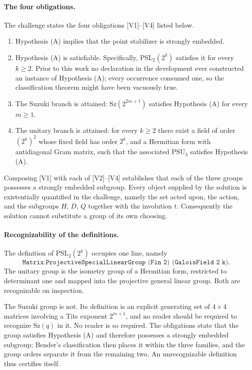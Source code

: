\documentclass{article}
\begin{document}
\paragraph{The four obligations.}
The challenge states the four obligations \textsc{[V1]}--\textsc{[V4]} listed
below.
\begin{enumerate}
  \item[\textsc{[V1]}] Hypothesis (A) implies that the point stabilizer is
  strongly embedded.

  \item[\textsc{[V2]}] Hypothesis (A) is satisfiable. Specifically,
  \(\mathrm{PSL}_2(2^k)\) satisfies it for every \(k\ge 2\). Prior to this work
  no declaration in the development ever constructed an instance of Hypothesis
  (A); every occurrence consumed one, so the classification theorem might have
  been vacuously true.

  \item[\textsc{[V3]}] The Suzuki branch is attained: \(\mathrm{Sz}(2^{2m+1})\)
  satisfies Hypothesis (A) for every \(m\ge 1\).

  \item[\textsc{[V4]}] The unitary branch is attained: for every \(k\ge2\) there
  exist a field of order \((2^k)^2\) whose fixed field has order \(2^k\), and a
  Hermitian form with antidiagonal Gram matrix, such that the associated
  \(\mathrm{PSU}_3\) satisfies Hypothesis (A).
\end{enumerate}
Composing \textsc{[V1]} with each of \textsc{[V2]}--\textsc{[V4]} establishes
that each of the three groups possesses a strongly embedded subgroup. Every
object supplied by the solution is existentially quantified in the challenge,
namely the set acted upon, the action, and the subgroups \(H\), \(D\), \(Q\)
together with the involution \(t\). Consequently the solution cannot substitute
a group of its own choosing.

\paragraph{Recognizability of the definitions.}
The definition of \(\mathrm{PSL}_2(2^k)\) occupies one line, namely
\[
  \texttt{Matrix.ProjectiveSpecialLinearGroup (Fin 2) (GaloisField 2 k)} .
\]
The unitary group is the isometry group of a Hermitian form, restricted to
determinant one and mapped into the projective general linear group. Both are
recognizable on inspection.

The Suzuki group is not. Its definition is an explicit generating set of
\(4\times4\) matrices involving a Tits exponent \(2^{m+1}\), and no reader
should be required to recognize \(\mathrm{Sz}(q)\) in it. No reader is so
required. The obligations state that the group satisfies Hypothesis (A) and
therefore possesses a strongly embedded subgroup; Bender's classification then
places it within the three families, and the group orders separate it from the
remaining two. An unrecognizable definition thus certifies itself.
\end{document}
